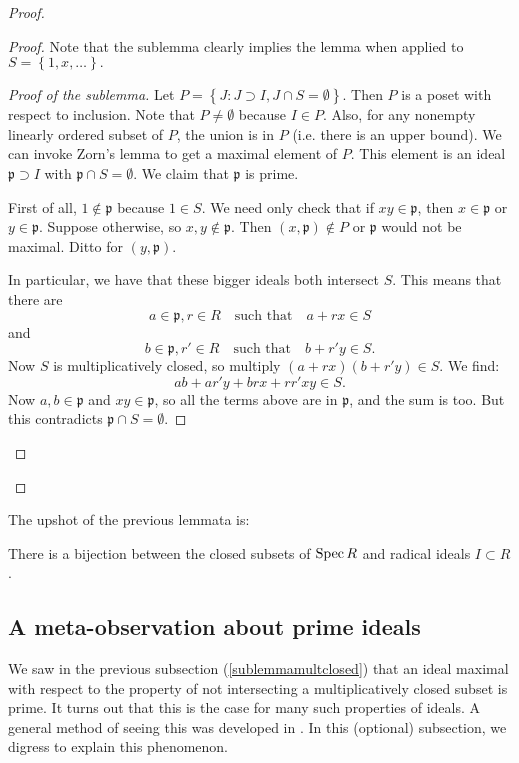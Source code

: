 \begin{proof}
\begin{proof}
Note that the sublemma clearly implies the lemma when applied to
$S =
\left\{1, x, \dots\right\}.$

\begin{proof}[Proof of the sublemma]
Let $P = \left\{J: J \supset I, J \cap S = \emptyset \right\}$.
Then $P$ is a
poset with respect to inclusion. Note that $P \neq \emptyset$
because $I \in P$. Also,
for any nonempty linearly ordered subset of $P$, the union is in
$P$ (i.e. there is an
upper bound).  
We can invoke Zorn's lemma to get a maximal element of $P$. This
element is an
ideal $\mathfrak{p} \supset I$ with $\mathfrak{p} \cap S =
\emptyset$. We claim
that $\mathfrak{p}$ is prime.

First of all, $1 \notin \mathfrak{p}$ because $1 \in S$. We need
only check
that if $xy \in \mathfrak{p}$, then $x \in \mathfrak{p}$ or $y
\in
\mathfrak{p}$. Suppose otherwise, so $x,y \notin \mathfrak{p}$.
Then $(x,\mathfrak{p}) \notin P$ or
$\mathfrak{p}$ would not be maximal. Ditto for $(y,
\mathfrak{p})$.

In particular, we have that these bigger ideals both intersect
$S$. This means
that there are 
\[ a \in \mathfrak{p} , r \in R \quad \text{such that}\quad a+rx
\in S \]
and 
\[ b \in \mathfrak{p} , r' \in R \quad \text{such that}\quad
b+r'y \in S .\]
Now $S$ is multiplicatively closed, so multiply $(a+rx)(b+r'y)
\in S$.
We find:
\[ ab + ar'y+brx+rr'xy \in S.  \]
Now $a,b \in \mathfrak{p}$ and $xy \in \mathfrak{p}$, so all the
terms above are in $\mathfrak{p}$, and the sum is too. But this contradicts
$\mathfrak{p}
\cap S = \emptyset$. 
\end{proof}
\end{proof} 
\end{proof} 
The upshot of the previous lemmata is:
\begin{proposition}
There is a bijection between the closed subsets of $\operatorname{Spec} R$ and
radical ideals
$I \subset R$.
\end{proposition}

\subsection{A meta-observation about prime ideals}

We saw in the previous subsection (\cref{sublemmamultclosed})
that an ideal maximal with respect to the property of not intersecting a
multiplicatively closed subset is prime.
It turns out that this is the case for many such properties of ideals.
A general method of seeing this was developed in \cite{LaRe08}.
In this (optional) subsection, we digress to explain this phenomenon.

